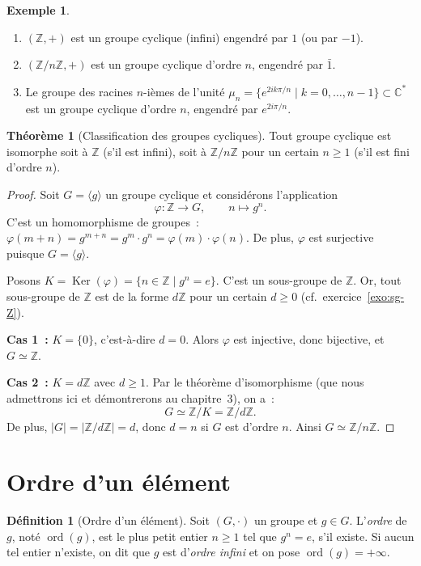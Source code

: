 \documentclass[12pt,a4paper,openany]{book}
\theoremstyle{definition}
\newtheorem{definition}{Définition}[chapter]
\newtheorem{theoreme}{Théorème}[chapter]
\newtheorem{exemple}{Exemple}[chapter]
\newcommand{\Z}{\mathbb{Z}}
\newcommand{\C}{\mathbb{C}}
\DeclareMathOperator{\Ker}{Ker}
\DeclareMathOperator{\ord}{ord}
\newcommand{\iso}{\simeq}
\newcommand{\abs}[1]{\lvert #1 \rvert}
\newcommand{\gen}[1]{\langle #1 \rangle}
\begin{document}
\begin{exemple}
\label{ex:cycliques-exemples}
\begin{enumerate}[label=(\roman*)]
  \item $(\Z, +)$ est un groupe cyclique (infini) engendré par $1$ (ou par $-1$).
  \item $(\Z/n\Z, +)$ est un groupe cyclique d'ordre $n$, engendré par $\bar{1}$.
  \item Le groupe des racines $n$-ièmes de l'unité $\mu_n = \{e^{2ik\pi/n} \mid k =
    0, \ldots, n-1\} \subset \C^*$ est un groupe cyclique d'ordre $n$, engendré par
    $e^{2i\pi/n}$.
\end{enumerate}
\end{exemple}

\begin{theoreme}[Classification des groupes cycliques]
\label{thm:classification-cycliques}
Tout groupe cyclique est isomorphe soit à $\Z$ (s'il est infini), soit à $\Z/n\Z$ pour
un certain $n \geq 1$ (s'il est fini d'ordre $n$).
\end{theoreme}

\begin{proof}
Soit $G = \gen{g}$ un groupe cyclique et considérons l'application
\[
  \varphi : \Z \longrightarrow G, \qquad n \longmapsto g^n.
\]
C'est un homomorphisme de groupes~: $\varphi(m + n) = g^{m+n} = g^m \cdot g^n =
\varphi(m) \cdot \varphi(n)$. De plus, $\varphi$ est surjective puisque $G = \gen{g}$.

Posons $K = \Ker(\varphi) = \{n \in \Z \mid g^n = e\}$. C'est un sous-groupe de $\Z$.
Or, tout sous-groupe de $\Z$ est de la forme $d\Z$ pour un certain $d \geq 0$
(cf.\ exercice~\ref{exo:sg-Z}).

\textbf{Cas 1~:} $K = \{0\}$, c'est-à-dire $d = 0$. Alors $\varphi$ est injective,
donc bijective, et $G \iso \Z$.

\textbf{Cas 2~:} $K = d\Z$ avec $d \geq 1$. Par le théorème d'isomorphisme
(que nous admettrons ici et démontrerons au chapitre~3), on a~:
\[
  G \iso \Z / K = \Z / d\Z.
\]
De plus, $\abs{G} = \abs{\Z/d\Z} = d$, donc $d = n$ si $G$ est d'ordre $n$. Ainsi $G
\iso \Z/n\Z$.
\end{proof}

\section{Ordre d'un élément}
\label{sec:ch1-ordre}

\begin{definition}[Ordre d'un élément]
\label{def:ordre-element}
Soit $(G, \cdot)$ un groupe et $g \in G$. L'\emph{ordre} de $g$, noté $\ord(g)$, est le
plus petit entier $n \geq 1$ tel que $g^n = e$, s'il existe. Si aucun tel entier
n'existe, on dit que $g$ est d'\emph{ordre infini} et on pose $\ord(g) = +\infty$.
\end{definition}
\end{document}
